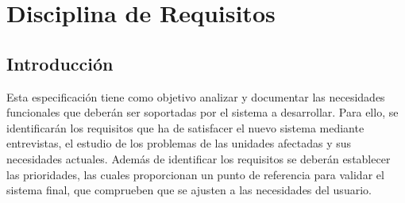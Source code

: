 
\chapter{Disciplina de Requisitos}
\label{chap:requisito}

  \section{Introducción}

    Esta especificación tiene como objetivo analizar y documentar las necesidades funcionales que deberán ser soportadas por el sistema a desarrollar. Para ello, se identificarán los requisitos que ha de satisfacer el nuevo sistema mediante entrevistas, el estudio de los problemas de las unidades afectadas y sus necesidades actuales. Además de identificar los requisitos se deberán establecer las prioridades, las cuales proporcionan un punto de referencia para validar el sistema final, que comprueben que se ajusten a las necesidades del usuario.

